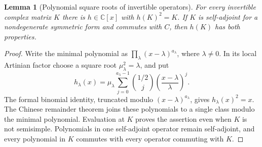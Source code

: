 \documentclass[11pt,reqno]{amsart}
\numberwithin{equation}{section}
\newtheorem{lemma}[theorem]{Lemma}
\theoremstyle{definition}\newtheorem{definition}[theorem]{Definition}
\theoremstyle{remark}\newtheorem{remark}[theorem]{Remark}
\newcommand{\C}{\mathbb C}\newcommand{\Q}{\mathbb Q}
\begin{document}
\begin{lemma}[Polynomial square roots of invertible operators]
\label{lem:artinian-polynomial-square-root}
For every invertible complex matrix \(K\) there is
\(h\in\C[x]\) with \(h(K)^2=K\).  If \(K\) is
self-adjoint for a nondegenerate symmetric form and commutes with
\(C\), then \(h(K)\) has both properties.
\end{lemma}
\begin{proof}
Write the minimal polynomial as
\(\prod_\lambda(x-\lambda)^{a_\lambda}\), where
\(\lambda\ne0\).  In its local Artinian factor choose a square
root \(\mu_\lambda^2=\lambda\), and put
\[
 h_\lambda(x)=\mu_\lambda
 \sum_{j=0}^{a_\lambda-1}\binom{1/2}{j}
          \left(\frac{x-\lambda}{\lambda}\right)^j.
\]
The formal binomial identity, truncated modulo
\((x-\lambda)^{a_\lambda}\), gives \(h_\lambda(x)^2=x\).
The Chinese remainder theorem joins these polynomials to a single
class modulo the minimal polynomial.  Evaluation at \(K\) proves
the assertion even when \(K\) is not semisimple.  Polynomials in
one self-adjoint operator remain self-adjoint, and every polynomial
in \(K\) commutes with every operator commuting with \(K\).
\end{proof}
\end{document}
